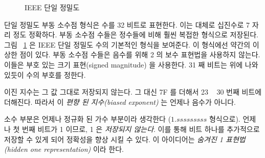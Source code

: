\begin{figure}[t]
\caption{IEEE 단일 정밀도\label{fig:IEEEsingle}}
\end{figure}

단일 정밀도 부동 소수점 형식은 수를 32 비트로 표현한다. 이는 대체로 십진수로 7 자리 정도
정확하다. 부동 소수점 수들은 정수들에 비해 훨씬 복접한 형식으로 저장된다.
그림 ~\ref{fig:IEEEsingle} 은 IEEE 단일 정밀도 수의 기본적인 형식을 보여준다. 
이 형식에선 약간의 이상한 점이 있다. 부동 소수점 수들은 음수를 위해 2 의 보수 표현법을 사용하지
않는다. 이들은 부호 있는 크기 표현(signed magnitude) 을 사용한다. 31 째 비트는 위에 나와있듯이
수의 부호를 정한다. 

이진 지수는 그 값 그대로 저장되지 않는다. 그 대신 7F 를 더해서 23 ~ 30 번째 비트에 더해진다.
따라서 이 \emph{편향 된 지수(biased exponent)} 는 언제나 음수가 아니다. 

소수 부분은 언제나 정규화 된 가수 부분이라 생각한다 ($1.sssssssss$ 형식으로). 언제나 첫 번째 비트가
1 이므로, 1 은 \emph{저장되지 않는다}. 이를 통해 비트 하나를 추가적으로 저장할 수 있게 되어 정확성을
향상 시킬 수 있다. 이 아이디어는 \emph{숨겨진 1 표현법(hidden one representation)} 이라 한다.

